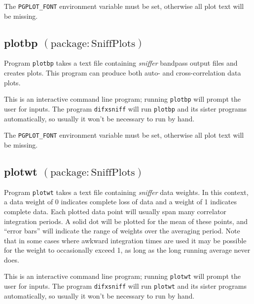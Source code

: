 The {\tt PGPLOT\_FONT} environment variable must be set, otherwise all plot text will be missing.






\subsection{plotbp {\small $\mathrm{(package: SniffPlots)}$} \label{sec:plotbp}}

Program {\tt plotbp} takes a text file containing {\em sniffer} bandpass output files and creates plots.
This program can produce both auto- and cross-correlation data plots.

This is an interactive command line program; running {\tt plotbp} will prompt the user for inputs.
The program {\tt difxsniff} will run {\tt plotbp} and its sister programs automatically, so usually it won't be necessary to run by hand.

The {\tt PGPLOT\_FONT} environment variable must be set, otherwise all plot text will be missing.






\subsection{plotwt {\small $\mathrm{(package: SniffPlots)}$} \label{sec:plotwt}}

Program {\tt plotwt} takes a text file containing {\em sniffer} data weights.
In this context, a data weight of 0 indicates complete loss of data and a weight of 1 indicates complete data.
Each plotted data point will usually span many correlator integration periods.
A solid dot will be plotted for the mean of these points, and ``error bars'' will indicate the range of weights over the averaging period.
Note that in some cases where awkward integration times are used it may be possible for the weight to occasionally exceed 1, as long as the long running average never does.

This is an interactive command line program; running {\tt plotwt} will prompt the user for inputs.
The program {\tt difxsniff} will run {\tt plotwt} and its sister programs automatically, so usually it won't be necessary to run by hand.

